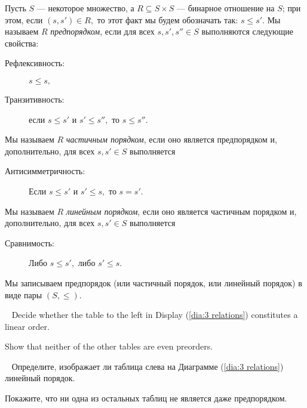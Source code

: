 \documentclass[../main/CT4S-EN-RU]{subfiles}
\begin{document}
\begin{definitionRUS}\label{def:orders}
Пусть $S$ — некоторое множество, а $R\subseteq S\times S$ — бинарное отношение на $S$; при этом, если $(s,s')\in R,$ то этот факт мы будем обозначать так: $s\leq s'.$ Мы называем $R$ {\em предпорядком}, если для всех $s,s',s''\in S$ выполняются следующие свойства:
\begin{description}
\item[Рефлексивность:] $s\leq s,$
\item[Транзитивность:] если $s\leq s'$ и $s'\leq s'',$ то $s\leq s''.$
\end{description}
Мы называем $R$ {\em частичным порядком}, если оно является предпорядком и, дополнительно, для всех $s,s'\in S$ выполняется
\begin{description}
\item[Антисимметричность:] Если $s\leq s'$ и $s'\leq s,$ то $s=s'.$
\end{description}
Мы называем $R$ {\em линейным порядком}, если оно является частичным порядком и, дополнительно, для всех $s,s'\in S$ выполняется
\begin{description}
\item[Сравнимость:] Либо $s\leq s',$ либо $s'\leq s.$
\end{description}
Мы записываем предпорядок (или частичный порядок, или линейный порядок) в виде пары $(S,\leq).$
\end{definitionRUS}

\begin{exerciseENG}~
\sexc Decide whether the table to the left in Display (\ref{dia:3 relations}) constitutes a linear order. 
\item Show that neither of the other tables are even preorders.
\endsexc
\end{exerciseENG}

\begin{exerciseRUS}~
\sexc Определите, изображает ли таблица слева на Диаграмме (\ref{dia:3 relations}) линейный порядок. 
\item Покажите, что ни одна из остальных таблиц не является даже предпорядком.
\endsexc
\end{exerciseRUS}
\end{document}

